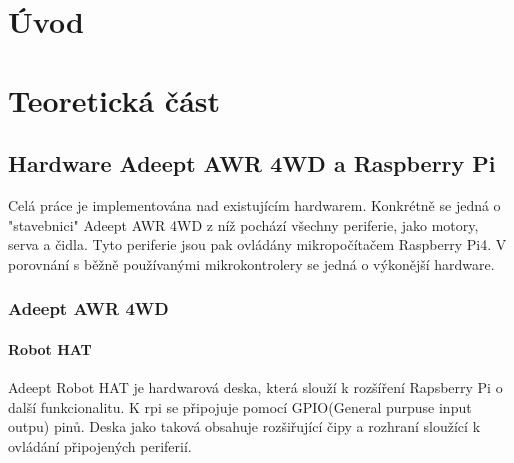 
%

\chapter{Úvod}

\chapter{Teoretická část} %

\section{Hardware Adeept AWR 4WD a Raspberry Pi}
Celá práce je implementována nad existujícím hardwarem. Konkrétně se jedná o "stavebnici" Adeept AWR 4WD z níž pochází všechny periferie, jako motory, serva a čidla. Tyto periferie jsou pak ovládány mikropočítačem Raspberry Pi4. V porovnání s běžně používanými mikrokontrolery se jedná o výkonější hardware.

\subsection*{Adeept AWR 4WD}

\subsubsection*{Robot HAT}
Adeept Robot HAT je hardwarová deska, která slouží k rozšíření Rapsberry Pi o další funkcionalitu. K rpi se připojuje pomocí GPIO(General purpuse input outpu) pinů. Deska jako taková obsahuje rozšiřující čipy a rozhraní sloužící k ovládání připojených periferií.

